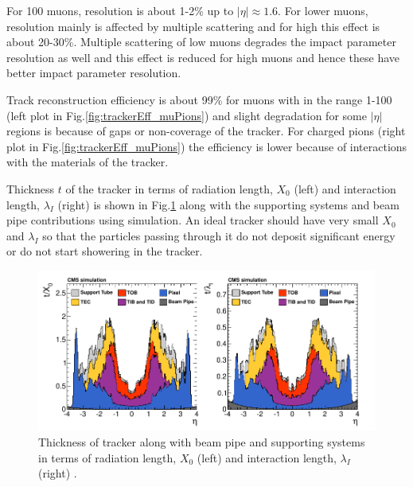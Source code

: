 For 100 \gev muons, \pt resolution is about 1-2\% up to $|\eta| \approx 1.6$. For lower \pt muons, resolution mainly is affected by multiple scattering and for high \pt this effect is about 20-30\%. Multiple scattering of low \pt muons degrades the impact parameter resolution as well and this effect is reduced for high \pt muons and hence these have better impact parameter resolution.

Track reconstruction efficiency is about 99\% for muons with \pt in the range 1-100 \gev (left plot in Fig.\ref{fig:trackerEff_muPions}) 
and slight degradation for some $|\eta|$ regions is because of gaps or non-coverage of the tracker. For charged pions (right plot in 
Fig.\ref{fig:trackerEff_muPions}) the efficiency is lower because of interactions with the materials of the tracker. 

Thickness $t$ of the 
tracker in terms of radiation length, $X_0$ (left) and interaction length, $\lambda_I$ (right) is shown in Fig.\ref{fig:tracker_material} 
along with the supporting systems and beam pipe contributions using simulation. An ideal tracker should have very small $X_0$ and 
$\lambda_I$ so that the particles passing through it do not deposit significant energy or do not start showering in the tracker.

\begin{figure}[h!]
\centering
\includegraphics[width=0.98\linewidth]{../Figures/Chap2/tracker_material}
\caption[Tracker material budget]{Thickness of tracker along with beam pipe and supporting systems in terms of radiation length, $X_0$ (left) and interaction length, $\lambda_I$ (right) \cite{Chatrchyan:2014fea}.}
\label{fig:tracker_material}
\end{figure}

